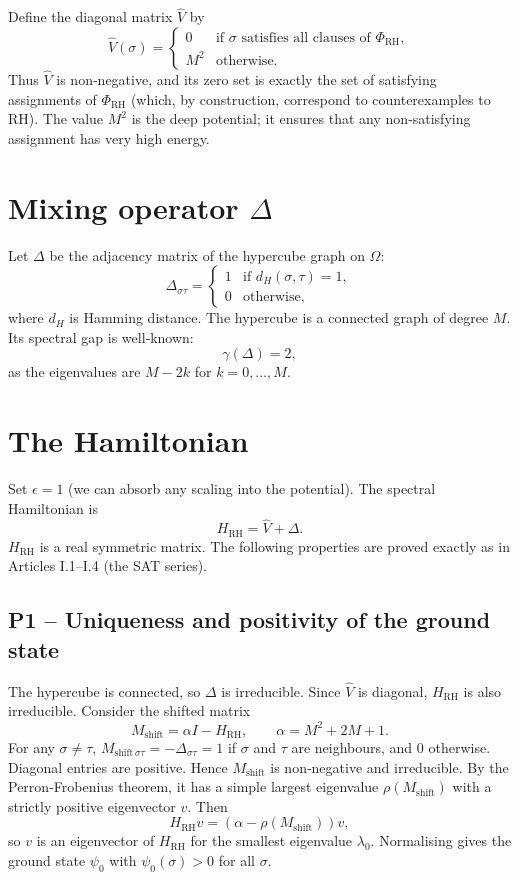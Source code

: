 \documentclass[11pt,a4paper]{article}
\begin{document}
Define the diagonal matrix \(\hat{V}\) by
\[
\hat{V}(\sigma) = 
\begin{cases}
0 & \text{if }\sigma\text{ satisfies all clauses of } \Phi_{\text{RH}},\\
M^2 & \text{otherwise}.
\end{cases}
\]
Thus \(\hat{V}\) is non‑negative, and its zero set is exactly the set of satisfying assignments of \(\Phi_{\text{RH}}\) (which, by construction, correspond to counterexamples to RH). The value \(M^2\) is the deep potential; it ensures that any non‑satisfying assignment has very high energy.

\section{Mixing operator \(\Delta\)}

Let \(\Delta\) be the adjacency matrix of the hypercube graph on \(\Omega\):
\[
\Delta_{\sigma\tau} = \begin{cases}
1 & \text{if } d_H(\sigma,\tau)=1,\\
0 & \text{otherwise},
\end{cases}
\]
where \(d_H\) is Hamming distance. The hypercube is a connected graph of degree \(M\). Its spectral gap is well‑known:
\[
\gamma(\Delta) = 2,
\]
as the eigenvalues are \(M - 2k\) for \(k=0,\dots,M\).

\section{The Hamiltonian}

Set \(\epsilon = 1\) (we can absorb any scaling into the potential). The spectral Hamiltonian is
\[
H_{\text{RH}} = \hat{V} + \Delta.
\]
\(H_{\text{RH}}\) is a real symmetric matrix. The following properties are proved exactly as in Articles I.1–I.4 (the SAT series).

\subsection{P1 – Uniqueness and positivity of the ground state}

The hypercube is connected, so \(\Delta\) is irreducible. Since \(\hat{V}\) is diagonal, \(H_{\text{RH}}\) is also irreducible. Consider the shifted matrix
\[
M_{\text{shift}} = \alpha I - H_{\text{RH}},\qquad \alpha = M^2 + 2M + 1.
\]
For any \(\sigma\neq\tau\), \(M_{\text{shift}\,\sigma\tau} = -\Delta_{\sigma\tau} = 1\) if \(\sigma\) and \(\tau\) are neighbours, and \(0\) otherwise. Diagonal entries are positive. Hence \(M_{\text{shift}}\) is non‑negative and irreducible. By the Perron‑Frobenius theorem, it has a simple largest eigenvalue \(\rho(M_{\text{shift}})\) with a strictly positive eigenvector \(v\). Then
\[
H_{\text{RH}} v = (\alpha - \rho(M_{\text{shift}})) v,
\]
so \(v\) is an eigenvector of \(H_{\text{RH}}\) for the smallest eigenvalue \(\lambda_0\). Normalising gives the ground state \(\psi_0\) with \(\psi_0(\sigma) > 0\) for all \(\sigma\).
\end{document}

